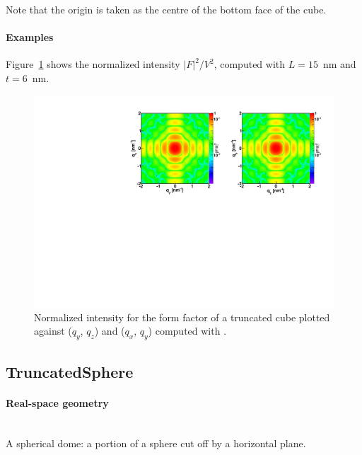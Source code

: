 Note that the origin is taken as the centre of the bottom face of the cube.


\paragraph{Examples}
Figure~\ref{fig:FFtrunccubeEx} shows the normalized intensity
$|F|^2/V^2$, computed with $L=15$~nm  and $t=6$~nm.

\begin{figure}[h]
\begin{center}
\includegraphics[angle=-90,width=\textwidth]{fig/ff/figfftruncatedcube.pdf}
\end{center}
\caption{Normalized intensity for the form factor of a truncated cube plotted against ($q_y$, $q_z$) and  ($q_x$, $q_y$)
  computed with .}
\label{fig:FFtrunccubeEx}
\end{figure}

\clearpage
\subsection{TruncatedSphere}\label{sec:TruncatedSphere}
  
\paragraph{Real-space geometry}\strut\\
A spherical dome: a portion of a sphere cut off by a horizontal plane.

